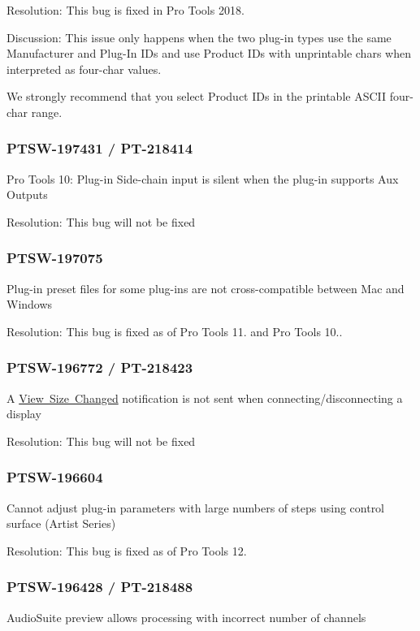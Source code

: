 Resolution\+: This bug is fixed in Pro Tools 2018.

Discussion\+: This issue only happens when the two plug-\/in types use the same Manufacturer and Plug-\/\+In I\+Ds and use Product I\+Ds with unprintable chars when interpreted as four-\/char values.

We strongly recommend that you select Product I\+Ds in the printable A\+S\+C\+II four-\/char range.\hypertarget{a00846_PTSW-197431}{}\subsubsection{P\+T\+S\+W-\/197431 / P\+T-\/218414}\label{a00846_PTSW-197431}
Pro Tools 10\+: Plug-\/in Side-\/chain input is silent when the plug-\/in supports Aux Outputs

Resolution\+: This bug will not be fixed\hypertarget{a00846_PTSW-197075}{}\subsubsection{P\+T\+S\+W-\/197075}\label{a00846_PTSW-197075}
Plug-\/in preset files for some plug-\/ins are not cross-\/compatible between Mac and Windows

Resolution\+: This bug is fixed as of Pro Tools 11. and Pro Tools 10..\hypertarget{a00846_PTSW-196772}{}\subsubsection{P\+T\+S\+W-\/196772 / P\+T-\/218423}\label{a00846_PTSW-196772}
A \mbox{\hyperlink{a00491_afab5ea2cfd731fc8f163b6caa685406ea74ab285136093261fd246572659f119c}{View Size Changed}} notification is not sent when connecting/disconnecting a display

Resolution\+: This bug will not be fixed\hypertarget{a00846_PTSW-196604}{}\subsubsection{P\+T\+S\+W-\/196604}\label{a00846_PTSW-196604}
Cannot adjust plug-\/in parameters with large numbers of steps using control surface (Artist Series)

Resolution\+: This bug is fixed as of Pro Tools 12.\hypertarget{a00846_PTSW-196428}{}\subsubsection{P\+T\+S\+W-\/196428 / P\+T-\/218488}\label{a00846_PTSW-196428}
Audio\+Suite preview allows processing with incorrect number of channels

